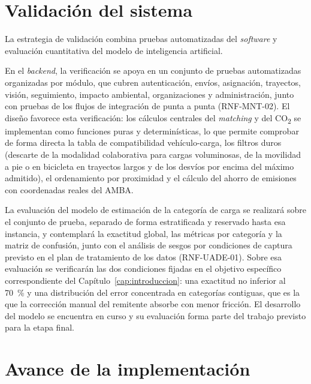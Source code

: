{%
\section{Validación del sistema}

La estrategia de validación combina pruebas automatizadas del \emph{software} y evaluación cuantitativa del modelo de inteligencia artificial.

En el \emph{backend}, la verificación se apoya en un conjunto de pruebas automatizadas organizadas por módulo, que cubren autenticación, envíos, asignación, trayectos, visión, seguimiento, impacto ambiental, organizaciones y administración, junto con pruebas de los flujos de integración de punta a punta (RNF-MNT-02). El diseño favorece esta verificación: los cálculos centrales del \emph{matching} y del CO\textsubscript{2} se implementan como funciones puras y determinísticas, lo que permite comprobar de forma directa la tabla de compatibilidad vehículo-carga, los filtros duros (descarte de la modalidad colaborativa para cargas voluminosas, de la movilidad a pie o en bicicleta en trayectos largos y de los desvíos por encima del máximo admitido), el ordenamiento por proximidad y el cálculo del ahorro de emisiones con coordenadas reales del AMBA.

La evaluación del modelo de estimación de la categoría de carga se realizará sobre el conjunto de prueba, separado de forma estratificada y reservado hasta esa instancia, y contemplará la exactitud global, las métricas por categoría y la matriz de confusión, junto con el análisis de sesgos por condiciones de captura previsto en el plan de tratamiento de los datos (RNF-UADE-01). Sobre esa evaluación se verificarán las dos condiciones fijadas en el objetivo específico correspondiente del Capítulo~\ref{cap:introduccion}: una exactitud no inferior al 70~\% y una distribución del error concentrada en categorías contiguas, que es la que la corrección manual del remitente absorbe con menor fricción. El desarrollo del modelo se encuentra en curso y su evaluación forma parte del trabajo previsto para la etapa final.

\section{Avance de la implementación}

}
